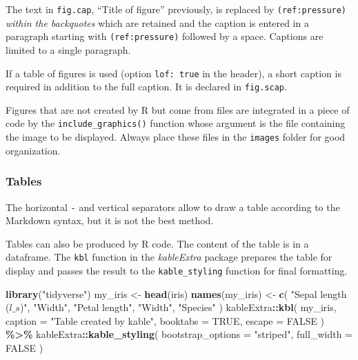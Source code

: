 \documentclass[
  12pt,
  american,
  a4paper,
  extrafontsizes,onecolumn,openright
  ]{memoir}
\newenvironment{Shaded}{\begin{snugshade}}{\end{snugshade}}
\newcommand{\AttributeTok}[1]{\textcolor[rgb]{0.13,0.29,0.53}{#1}}
\newcommand{\ConstantTok}[1]{\textcolor[rgb]{0.56,0.35,0.01}{#1}}
\newcommand{\FunctionTok}[1]{\textcolor[rgb]{0.13,0.29,0.53}{\textbf{#1}}}
\newcommand{\NormalTok}[1]{#1}
\newcommand{\OtherTok}[1]{\textcolor[rgb]{0.56,0.35,0.01}{#1}}
\newcommand{\SpecialCharTok}[1]{\textcolor[rgb]{0.81,0.36,0.00}{\textbf{#1}}}
\newcommand{\StringTok}[1]{\textcolor[rgb]{0.31,0.60,0.02}{#1}}
\begin{document}
\normalsize

The text in \texttt{fig.cap}, \enquote{Title of figure} previously, is replaced by \texttt{(ref:pressure)} \emph{within the backquotes} which are retained and the caption is entered in a paragraph starting with \texttt{(ref:pressure)} followed by a space.
Captions are limited to a single paragraph.

If a table of figures is used (option \texttt{lof:\ true} in the header), a short caption is required in addition to the full caption.
It is declared in \texttt{fig.scap}.

Figures that are not created by R but come from files are integrated in a piece of code by the \texttt{include\_graphics()} function whose argument is the file containing the image to be displayed.
Always place these files in the \texttt{images} folder for good organization.

\subsubsection{Tables}\label{tables}

The horizontal \texttt{-} and vertical \texttt{\textbar{}} separators allow to draw a table according to the Markdown syntax, but it is not the best method.

Tables can also be produced by R code.
The content of the table is in a dataframe.
The \texttt{kbl} function in the \emph{kableExtra} package prepares the table for display and passes the result to the \texttt{kable\_styling} function for final formatting.

\scriptsize

\begin{Shaded}
\begin{Highlighting}[]
\FunctionTok{library}\NormalTok{(}\StringTok{"tidyverse"}\NormalTok{)}
\NormalTok{my\_iris }\OtherTok{\textless{}{-}} \FunctionTok{head}\NormalTok{(iris)}
\FunctionTok{names}\NormalTok{(my\_iris) }\OtherTok{\textless{}{-}} \FunctionTok{c}\NormalTok{(}
  \StringTok{"Sepal length ($l\_s$)"}\NormalTok{, }
  \StringTok{"Width"}\NormalTok{, }
  \StringTok{"Petal length"}\NormalTok{, }
  \StringTok{"Width"}\NormalTok{, }
  \StringTok{"Species"}
\NormalTok{)}
\NormalTok{kableExtra}\SpecialCharTok{::}\FunctionTok{kbl}\NormalTok{(}
\NormalTok{  my\_iris, }
  \AttributeTok{caption =} \StringTok{"Table created by kable"}\NormalTok{, }
  \AttributeTok{booktabs =} \ConstantTok{TRUE}\NormalTok{, }
  \AttributeTok{escape =} \ConstantTok{FALSE}
\NormalTok{) }\SpecialCharTok{\%\textgreater{}\%}
\NormalTok{  kableExtra}\SpecialCharTok{::}\FunctionTok{kable\_styling}\NormalTok{(}
    \AttributeTok{bootstrap\_options =} \StringTok{"striped"}\NormalTok{, }
    \AttributeTok{full\_width =} \ConstantTok{FALSE}
\NormalTok{  )}
\end{Highlighting}
\end{Shaded}
\end{document}
